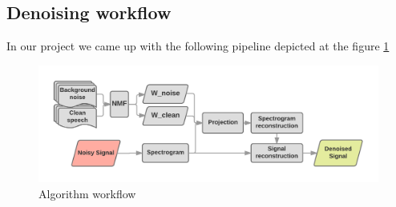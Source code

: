 \documentclass[11pt]{article}
\makeatletter
\def\maxwidth{\ifdim\Gin@nat@width>\linewidth\linewidth
    \else\Gin@nat@width\fi}
\makeatother
\begin{document}
\subsection{Denoising workflow}

In our project we came up with the following pipeline depicted at the figure \ref{fig:pipeline}
\begin{figure}[H]
\centering
\includegraphics[width=1.\maxwidth]{solution.png}
\caption{Algorithm workflow}
\label{fig:pipeline}
\end{figure}
\end{document}
